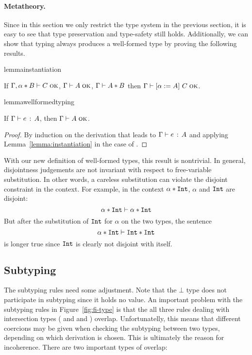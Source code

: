 \paragraph{Metatheory.}

Since in this section we only restrict the type system in the previous section,
it is easy to see that type preservation and type-safety still holds.
Additionally, we can show that typing always produces a well-formed type by
proving the following results.

\begin{restatable}[Instantiation]{lemma}{instantiation}
  \label{lemma:instantiation}

  If $\Gamma, \alpha * B \vdash C \; \textsc{ok}$, $\Gamma \vdash A \; \textsc{ok}$, $\Gamma \vdash A * B$
  then $\Gamma \vdash \lbrack \alpha := A \rbrack~ C \; \textsc{ok}$.
\end{restatable}

\begin{restatable}{lemma}{wellformedtyping}
  \label{lemma:wellformed-typing}

  If $\Gamma \vdash e \ \!:\! \ A$, then $\Gamma \vdash A \; \textsc{ok}$.
\end{restatable}

\begin{proof}
  By induction on the derivation that leads to $\Gamma \vdash e \ \!:\! \ A$ and applying
  Lemma~\ref{lemma:instantiation} in the case of .
\end{proof}

With our new definition of well-formed types, this result is nontrivial.
In general, disjointness judgements are not invariant with respect to
free-variable substitution. In other words, a careless substitution can violate
the disjoint constraint in the context. For example, in the context $\alpha
* \texttt{Int}$, $\alpha$ and $\texttt{Int}$ are disjoint:
\[ \alpha * \texttt{Int} \vdash \alpha * \texttt{Int} \]
But after the substitution of $\texttt{Int}$ for $\alpha$ on the two types, the sentence
\[ \alpha * \texttt{Int} \vdash \texttt{Int} * \texttt{Int} \]
is longer true since $\texttt{Int}$ is clearly not disjoint with itself.

\subsection{Subtyping}


The subtyping rules need some adjustment.
Note that the $\bot$ type does not participate in subtyping since it holds no value.
An important
problem with the subtyping rules in Figure~\ref{fig:fi-type} is that the all three rules
dealing with intersection types
( and  and )
overlap. Unfortunatelly,
this means that different coercions may be given when checking the subtyping
between two types, depending on which derivation is chosen. This is ultimately the reason
for incoherence.
There are two important types of overlap:

